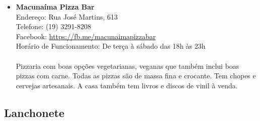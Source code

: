 \begin{itemize}
\item \textbf{Macunaíma Pizza Bar}
  \\Endereço: Rua José Martins, 613
  \\Telefone: (19) 3291-8208
  \\Facebook: \url{https://fb.me/macunaimapizzabar}
  \\Horário de Funcionamento: De terça à sábado das 18h às 23h
  \\
  \\Pizzaria com boas opções vegetarianas, veganas que também inclui boas pizzas
  com carne. Todas as pizzas são de massa fina e crocante. Tem chopes e cervejas
  artesanais. A casa também tem livros e discos de vinil à venda.
\end{itemize}

\subsection{Lanchonete}

